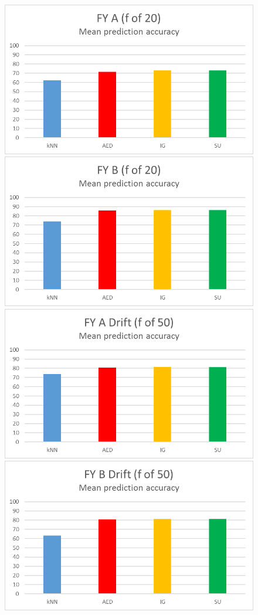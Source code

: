 \begin{figure}[hp]
\includegraphics[scale=0.17]{Graphs/FY_A/bar20}
\includegraphics[scale=0.17]{Graphs/FY_B/bar20}
\includegraphics[scale=0.17]{Graphs/FY_A_Drift/bar}
\includegraphics[scale=0.17]{Graphs/FY_B_Drift/bar}

\end{figure}
